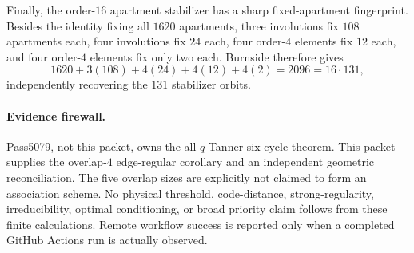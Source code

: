 Finally, the order-$16$ apartment stabilizer has a sharp fixed-apartment
fingerprint.  Besides the identity fixing all $1620$ apartments, three
involutions fix $108$ apartments each, four involutions fix $24$ each, four
order-$4$ elements fix $12$ each, and four order-$4$ elements fix only two each.
Burnside therefore gives
\[
 1620+3(108)+4(24)+4(12)+4(2)=2096=16\cdot131,
\]
independently recovering the $131$ stabilizer orbits.

\paragraph{Evidence firewall.}
Pass5079, not this packet, owns the all-$q$ Tanner-six-cycle theorem.  This
packet supplies the overlap-$4$ edge-regular corollary and an independent
geometric reconciliation.  The five overlap sizes are explicitly not claimed
to form an association scheme.  No physical threshold, code-distance,
strong-regularity, irreducibility, optimal conditioning, or broad priority
claim follows from these finite calculations.  Remote workflow success is
reported only when a completed GitHub Actions run is actually observed.
\fi
